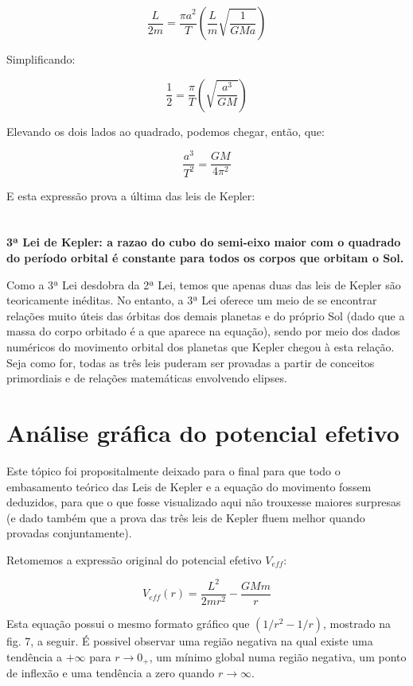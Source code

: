 \[
	\frac{L}{2m} = \frac{\pi a^2}{T}\left(\frac{L}{m}\sqrt{\frac{1}{GMa}}\right)
\]

Simplificando:

\[
	\frac{1}{2} = \frac{\pi}{T}\left(\sqrt{\frac{a^3}{GM}}\right)
\]

Elevando os dois lados ao quadrado, podemos chegar, então, que:

\begin{equation}
	\frac{a^3}{T^2} = \frac{GM}{4\pi^2} \label{eq60}
\end{equation}

E esta expressão prova a última das leis de Kepler:{\\}{\\}{\\}
\textbf{\Large{3ª Lei de Kepler: a razao do cubo do semi-eixo maior com o quadrado do período orbital é constante para todos os corpos que orbitam o Sol.}} {\\}

Como a 3ª Lei desdobra da 2ª Lei, temos que apenas duas das leis de Kepler são teoricamente inéditas. No entanto, a 3ª Lei oferece um meio de se encontrar relações muito úteis das órbitas dos demais planetas e do próprio Sol (dado que a massa do corpo orbitado é a que aparece na equação), sendo por meio dos dados numéricos do movimento orbital dos planetas que Kepler chegou à esta relação. Seja como for, todas as três leis puderam ser provadas a partir de conceitos primordiais e de relações matemáticas envolvendo elipses.

\section{Análise gráfica do potencial efetivo}

Este tópico foi propositalmente deixado para o final para que todo o embasamento teórico das Leis de Kepler e a equação do movimento fossem deduzidos, para que o que fosse visualizado aqui não trouxesse maiores surpresas (e dado também que a prova das três leis de Kepler fluem melhor quando provadas conjuntamente).{\\}

Retomemos a expressão original do potencial efetivo $V_{eff}$:

\[
	V_{eff}(r) = \frac{L^2}{2mr^2} - \frac{GMm}{r} 
\]

Esta equação possui o mesmo formato gráfico que $(1/r^2 - 1/r)$, mostrado na fig. 7, a seguir. É possivel observar uma região negativa na qual existe uma tendência a $+\infty$ para $r \rightarrow 0_+$, um mínimo global numa região negativa, um ponto de inflexão e uma tendência a zero quando $r \rightarrow \infty$.

